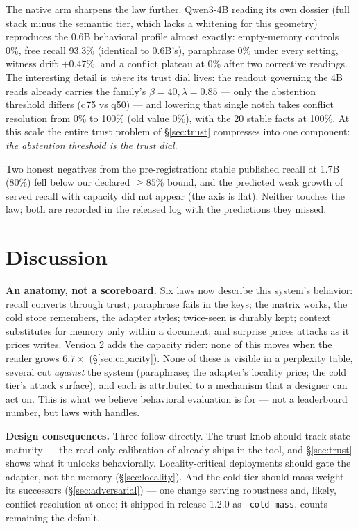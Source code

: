 \documentclass[11pt]{article}
\begin{document}
The native arm sharpens the law further. Qwen3-4B reading its own dossier (full stack minus the semantic tier, which lacks a whitening for this geometry) reproduces the 0.6B behavioral profile almost exactly: empty-memory controls 0\%, free recall 93.3\% (identical to 0.6B's), paraphrase 0\% under every setting, witness drift $+0.47\%$, and a conflict plateau at 0\% after two corrective readings. The interesting detail is \emph{where} its trust dial lives: the readout governing the 4B reads already carries the family's $\beta{=}40,\lambda{=}0.85$ --- only the abstention threshold differs (q75 vs q50) --- and lowering that single notch takes conflict resolution from 0\% to 100\% (old value 0\%), with the 20 stable facts at 100\%. At this scale the entire trust problem of \S\ref{sec:trust} compresses into one component: \emph{the abstention threshold is the trust dial}.

Two honest negatives from the pre-registration: stable published recall at 1.7B (80\%) fell below our declared $\geq 85\%$ bound, and the predicted weak growth of served recall with capacity did not appear (the axis is flat). Neither touches the law; both are recorded in the released log with the predictions they missed.

\section{Discussion}

\textbf{An anatomy, not a scoreboard.} Six laws now describe this system's behavior: recall converts through trust; paraphrase fails in the keys; the matrix works, the cold store remembers, the adapter styles; twice-seen is durably kept; context substitutes for memory only within a document; and surprise prices attacks as it prices writes. Version 2 adds the capacity rider: none of this moves when the reader grows $6.7\times$ (\S\ref{sec:capacity}). None of these is visible in a perplexity table, several cut \emph{against} the system (paraphrase; the adapter's locality price; the cold tier's attack surface), and each is attributed to a mechanism that a designer can act on. This is what we believe behavioral evaluation is for --- not a leaderboard number, but laws with handles.

\textbf{Design consequences.} Three follow directly. The trust knob should track state maturity --- the read-only calibration of \cite{drafter} already ships in the tool, and \S\ref{sec:trust} shows what it unlocks behaviorally. Locality-critical deployments should gate the adapter, not the memory (\S\ref{sec:locality}). And the cold tier should mass-weight its successors (\S\ref{sec:adversarial}) --- one change serving robustness and, likely, conflict resolution at once; it shipped in release 1.2.0 as \texttt{--cold-mass}, counts remaining the default.
\end{document}
